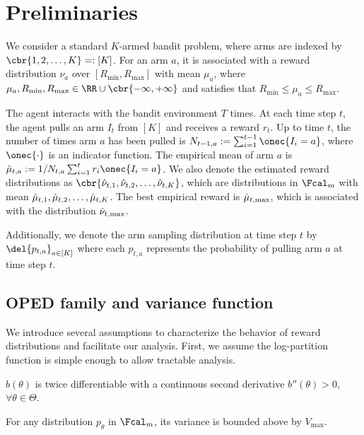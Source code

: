 \section{Preliminaries} \label{sec:preliminary}

We consider a standard $K$-armed bandit problem, where arms are indexed by $\cbr{1, 2, \dots, K} =: [K]$.
For an arm $a$, it is associated with a reward distribution $\nu_a$ over $[R_{\min}, R_{\max}]$ with mean $\mu_a$, where $\mu_a, R_{\min}, R_{\max} \in \RR \cup \cbr{-\infty, +\infty}$ and satisfies that $R_{\min} \leq \mu_a \leq R_{\max}$.

The agent interacts with the bandit environment $T$ times. 
At each time step $t$, the agent pulls an arm $I_t$ from $[K]$ and receives a reward $r_t$. Up to time $t$, the number of times arm $a$ has been pulled is $N_{t-1, a} := \sum_{i=1}^{t-1} \onec{I_i = a}$, where $\onec{\cdot}$ is an indicator function.
The empirical mean of arm $a$ is $\hmu_{t, a} := 1/N_{t, a}\sum_{i=1}^t r_{i} \onec{I_i = a}$.
We also denote the estimated reward distributions as $\cbr{\hnu_{t,1}, \hnu_{t,2}, \dots, \hnu_{t, K}}$, which are distributions in $\Fcal_m$ with mean ${\hat\mu}_{t,1}, {\hat\mu}_{t,2}, \dots, {\hat\mu}_{t, K}$.
The best empirical reward is ${\hat\mu}_{t, \max}$, which is associated with the distribution ${\hat\nu}_{t,\max}$.

Additionally, we denote the arm sampling distribution at time step $t$ by $\del{p_{t, a}}_{a\in[K]}$ where each $p_{t, a}$ represents the probability of pulling arm $a$ at time step $t$.

\subsection{OPED family and variance function}


We introduce several assumptions to characterize the behavior of reward distributions and facilitate our analysis.
First, we assume the log-partition function is simple enough to allow tractable analysis.

\begin{assum} \label{assum:oped}
     $b(\theta)$ is twice differentiable with a continuous second derivative 
     $b''(\theta) > 0$, $\forall \theta \in \Theta$.
\end{assum}

\begin{assum} \label{assum:max-variance}
For any distribution $p_\theta$ in $\Fcal_m$, its variance is bounded above by $V_{\max}$.
\end{assum}

